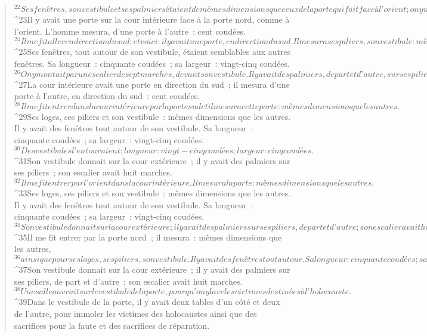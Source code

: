 \begin{verse}
${}^{22}Ses fenêtres, son vestibule et ses palmiers étaient de mêmes dimensions que ceux de la porte qui fait face à l’orient ; on y montait par sept marches, devant le vestibule. 
${}^{23}Il y avait une porte sur la cour intérieure face à la porte nord, comme à l’orient. L’homme mesura, d’une porte à l’autre : cent coudées.
${}^{24}Il me fit aller en direction du sud ; et voici : il y avait une porte, en direction du sud. Il mesura ses piliers, son vestibule : mêmes dimensions que les autres. 
${}^{25}Ses fenêtres, tout autour de son vestibule, étaient semblables aux autres fenêtres. Sa longueur : cinquante coudées ; sa largeur : vingt-cinq coudées. 
${}^{26}On y montait par un escalier de sept marches, devant son vestibule. Il y avait des palmiers, de part et d’autre, sur ses piliers. 
${}^{27}La cour intérieure avait une porte en direction du sud ; il mesura d’une porte à l’autre, en direction du sud : cent coudées.
${}^{28}Il me fit entrer dans la cour intérieure par la porte sud et il mesura cette porte : mêmes dimensions que les autres. 
${}^{29}Ses loges, ses piliers et son vestibule : mêmes dimensions que les autres. Il y avait des fenêtres tout autour de son vestibule. Sa longueur : cinquante coudées ; sa largeur : vingt-cinq coudées. 
${}^{30}Des vestibules l’entouraient ; longueur : vingt-cinq coudées ; largeur : cinq coudées. 
${}^{31}Son vestibule donnait sur la cour extérieure ; il y avait des palmiers sur ses piliers ; son escalier avait huit marches.
${}^{32}Il me fit entrer par l’orient dans la cour intérieure. Il mesura la porte : mêmes dimensions que les autres. 
${}^{33}Ses loges, ses piliers et son vestibule : mêmes dimensions que les autres. Il y avait des fenêtres tout autour de son vestibule. Sa longueur : cinquante coudées ; sa largeur : vingt-cinq coudées. 
${}^{34}Son vestibule donnait sur la cour extérieure ; il y avait des palmiers sur ses piliers, de part et d’autre ; son escalier avait huit marches.
${}^{35}Il me fit entrer par la porte nord ; il mesura : mêmes dimensions que les autres, 
${}^{36}ainsi que pour ses loges, ses piliers, son vestibule. Il y avait des fenêtres tout autour. Sa longueur : cinquante coudées ; sa largeur : vingt-cinq coudées. 
${}^{37}Son vestibule donnait sur la cour extérieure ; il y avait des palmiers sur ses piliers, de part et d’autre ; son escalier avait huit marches.
${}^{38}Une salle ouvrait sur le vestibule de la porte, pour qu’on y lave les victimes destinées à l’holocauste. 
${}^{39}Dans le vestibule de la porte, il y avait deux tables d’un côté et deux de l’autre, pour immoler les victimes des holocaustes ainsi que des sacrifices pour la faute et des sacrifices de réparation. 

\end{verse}
